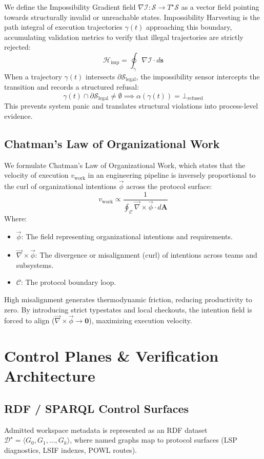 \documentclass[11pt,a4paper,oneside]{book}
\begin{document}
We define the Impossibility Gradient field $\nabla \mathcal{I}: \mathcal{S} \to T^{\star}\mathcal{S}$ as a vector field pointing towards structurally invalid or unreachable states. Impossibility Harvesting is the path integral of execution trajectories $\gamma(t)$ approaching this boundary, accumulating validation metrics to verify that illegal trajectories are strictly rejected:
\[
\mathcal{H}_{\mathrm{imp}} = \oint_{\gamma} \nabla \mathcal{I} \cdot d\mathbf{s}
\]
When a trajectory $\gamma(t)$ intersects $\partial \mathcal{S}_{\mathrm{legal}}$, the impossibility sensor intercepts the transition and records a structured refusal:
\[
\gamma(t) \cap \partial \mathcal{S}_{\mathrm{legal}} \neq \emptyset \implies \alpha(\gamma(t)) = \bot_{\mathrm{refused}}
\]
This prevents system panic and translates structural violations into process-level evidence.

\section{Chatman's Law of Organizational Work}
We formulate Chatman's Law of Organizational Work, which states that the velocity of execution $v_{\mathrm{work}}$ in an engineering pipeline is inversely proportional to the curl of organizational intentions $\vec{\phi}$ across the protocol surface:
\[
\boxed{ v_{\mathrm{work}} \propto \frac{1}{\oint_{\mathcal{C}} \vec{\nabla} \times \vec{\phi} \cdot d\mathbf{A}} }
\]
Where:
\begin{itemize}
    \item $\vec{\phi}$: The field representing organizational intentions and requirements.
    \item $\vec{\nabla} \times \vec{\phi}$: The divergence or misalignment (curl) of intentions across teams and subsystems.
    \item $\mathcal{C}$: The protocol boundary loop.
\end{itemize}
High misalignment generates thermodynamic friction, reducing productivity to zero. By introducing strict typestates and local checkouts, the intention field is forced to align ($\vec{\nabla} \times \vec{\phi} \to \mathbf{0}$), maximizing execution velocity.

\chapter{Control Planes \& Verification Architecture}

\section{RDF / SPARQL Control Surfaces}
Admitted workspace metadata is represented as an RDF dataset $\mathcal{D}^{\star} = \langle G_0, G_1, \dots, G_k \rangle$, where named graphs map to protocol surfaces (LSP diagnostics, LSIF indexes, POWL routes).
\end{document}
